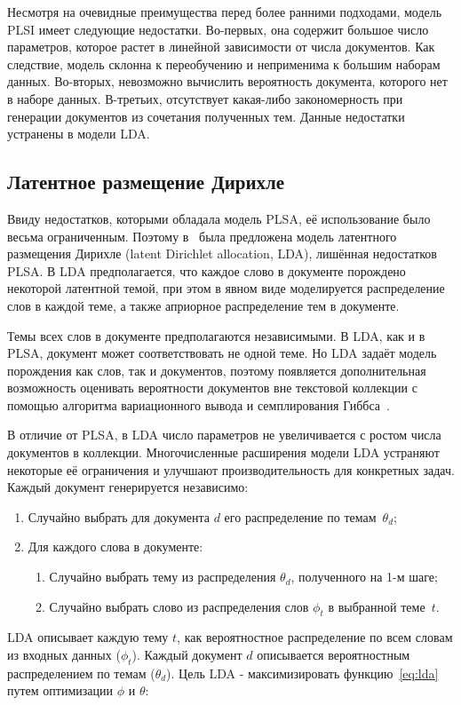 Несмотря на очевидные преимущества перед более ранними подходами, модель PLSI имеет следующие недостатки. Во-первых, она содержит большое число параметров, которое растет в линейной зависимости от числа документов. Как следствие, модель склонна к переобучению и неприменима к большим наборам данных. Во-вторых, невозможно вычислить вероятность документа, которого нет в наборе данных. В-третьих, отсутствует какая-либо закономерность при генерации документов из сочетания полученных тем. Данные недостатки устранены в модели LDA.

\subsection{Латентное размещение Дирихле}
\label{ch1:lda}

Ввиду недостатков, которыми обладала модель PLSA, её использование было весьма ограниченным. Поэтому в~\cite{LDA} была предложена модель латентного размещения Дирихле (latent Dirichlet allocation, LDA), лишённая недостатков PLSA. В LDA предполагается, что каждое слово в документе порождено некоторой латентной темой, при этом в явном виде моделируется распределение слов в каждой теме, а также априорное распределение тем в документе. 

Темы всех слов в документе предполагаются независимыми. В LDA, как и в PLSA, документ может соответствовать не одной теме. Но LDA задаёт модель порождения как слов, так и документов, поэтому появляется дополнительная возможность оценивать вероятности документов вне текстовой коллекции с помощью алгоритма вариационного вывода и семплирования Гиббса~\cite{gibbs}. 

В отличие от PLSA, в LDA число параметров не увеличивается с ростом числа документов в коллекции. Многочисленные расширения модели LDA устраняют некоторые её ограничения и улучшают производительность для конкретных задач. 
Каждый документ генерируется независимо:

\begin{enumerate}
\item Случайно выбрать для документа $d$ его распределение по темам~$\theta_d$;
\item Для каждого слова в документе:
\begin{enumerate}
\item Случайно выбрать тему из распределения $\theta_d$, полученного на 1-м шаге;
\item Случайно выбрать слово из распределения слов  $\phi_t$ в выбранной теме~$t$.
\end{enumerate}
\end{enumerate}
LDA описывает каждую тему $t$, как вероятностное распределение по всем словам из входных данных ($\phi_t$). Каждый документ $d$ описывается вероятностным распределением по темам ($\theta_d$). Цель LDA - максимизировать функцию~\eqref{eq:lda} путем оптимизации $\phi$ и $\theta$:

